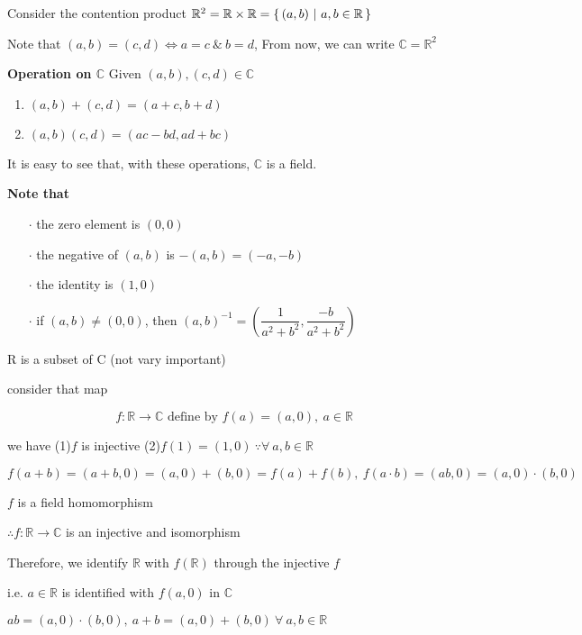 Consider the contention product $\mathbb R^2 = \mathbb R \times \mathbb R = \left\{ \,(a,b)~|~a,b\in \mathbb R \,\right\}$

Note that $(a,b) = (c,d) \Leftrightarrow a=c ~\&~ b = d$, From now, we can write $\mathbb C = \mathbb R^2 $

\begin{tcolorbox}
	\textbf{Operation on $\mathbb C$}
	Given $(a,b),(c,d) \in \mathbb C$

	\begin{enumerate}
		\item $(a,b)+(c,d) = (a+c,b+d)$
		\item $(a,b)(c,d) = (ac-bd,ad+bc)$
	\end{enumerate}
	
	It is easy to see that, with these operations, $\mathbb C$ is a field.
\end{tcolorbox}

\textbf{Note that}
\begin{enumerate}
	\item[$\cdot$] the zero element is $(0,0)$
	\item[$\cdot$] the negative of $(a,b)$ is $-(a,b) = (-a,-b)$
	\item[$\cdot$] the identity is $(1,0)$
	\item[$\cdot$] if $(a,b) \neq (0,0)$, then $(a,b)^{-1} = \left(\dfrac{1}{a^2+b^2},\dfrac{-b}{a^2+b^2}\right)$
\end{enumerate}


\begin{tcolorbox}
	R is a subset of C \color{blue}(not vary important)\color{black}
	
	consider that map
	
	$$f:\mathbb R \rightarrow \mathbb C \text{ define by } f(a) = (a,0),~a \in \mathbb R$$
	
	we have (1)$f$ is injective (2)$f(1) = (1,0)~ \because \forall~a,b \in \mathbb R$
	
	$f(a+b) = (a+b,0) = (a,0)+(b,0) = f(a) + f(b),~f(a\cdot b) = (ab,0) = (a,0) \cdot (b,0)$
	
	$f$ is a field homomorphism
	
	$\therefore f:\mathbb R \rightarrow \mathbb C$ is an injective and isomorphism
	
	Therefore, we identify $\mathbb R$ with $f(\mathbb R)$ through the injective $f$ 
	
	i.e. $a \in \mathbb R$ is identified with $f(a,0)$ in $\mathbb C$
	
	$ab = (a,0)\cdot(b,0),~a+b = (a,0)+(b,0) ~\forall~a,b\in \mathbb R$
	
\end{tcolorbox}

